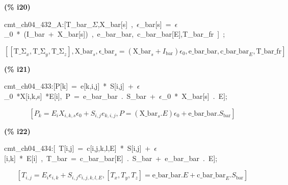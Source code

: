 \documentclass[fleqn]{article}
\begin{document}
\noindent
\begin{minipage}[t]{4.000000em}\color{red}\bfseries
(\% i20)	
\end{minipage}
\begin{minipage}[t]{\textwidth}\color{blue}
cmt\_ch04\_432\_A:[T\_bar\_\ensuremath{\Sigma},X\_bar[s]\ ,\ \ensuremath{\epsilon}\_bar[s]\ =\ \ensuremath{\epsilon}\_0\ *\ (I\_bar\ +\ X\_bar[s])\ ,\ e\_bar\_bar,\ c\_bar\_bar[E],T\_bar\_fr\ ]\ ;
\end{minipage}
\[\displaystyle \tag{\% o20} 
\left[ \left[ {{\ensuremath{\mathrm{T\_ \Sigma }}}_x}\operatorname{,}{{\ensuremath{\mathrm{T\_ \Sigma }}}_y}\operatorname{,}{{\ensuremath{\mathrm{T\_ \Sigma }}}_z}\right] \operatorname{,}{{\ensuremath{\mathrm{X\_ bar}}}_s}\operatorname{,}{{\ensuremath{\mathrm{\epsilon \_ bar}}}_s}=\left( {{\ensuremath{\mathrm{X\_ bar}}}_s}+{I_{\ensuremath{\mathrm{bar}}}}\right)  {{\epsilon }_0}\operatorname{,}\ensuremath{\mathrm{e\_ bar\_ bar}}\operatorname{,}{{\ensuremath{\mathrm{c\_ bar\_ bar}}}_E}\operatorname{,}\ensuremath{\mathrm{T\_ bar\_ fr}}\right] \mbox{}
\]


\noindent
\begin{minipage}[t]{4.000000em}\color{red}\bfseries
(\% i21)	
\end{minipage}
\begin{minipage}[t]{\textwidth}\color{blue}
cmt\_ch04\_433:[P[k]\ =\ e[k,i,j]\ *\ S[i,j]\ +\ \ensuremath{\epsilon}\_0\ *X[i,k,s]\ *E[i],\ P\ =\ e\_bar\_bar\ .\ S\_bar\ +\ \ensuremath{\epsilon}\_0\ *\ X\_bar[s]\ .\ E];
\end{minipage}
\[\displaystyle \tag{\% o21} 
\left[ {P_k}={E_i} {X_{i,k,s}} {{\epsilon }_0}+{S_{i,j}} {e_{k,i,j}}\operatorname{,}P=\left( {{\ensuremath{\mathrm{X\_ bar}}}_s}\ensuremath{\mathrm{ . }}E\right)  {{\epsilon }_0}+\ensuremath{\mathrm{e\_ bar\_ bar}}\ensuremath{\mathrm{ . }}{S_{\ensuremath{\mathrm{bar}}}}\right] \mbox{}
\]


\noindent
\begin{minipage}[t]{4.000000em}\color{red}\bfseries
(\% i22)	
\end{minipage}
\begin{minipage}[t]{\textwidth}\color{blue}
cmt\_ch04\_434:[\ T[i,j]\ =\ c[i,j,k,l,E]\ *\ S[i,j]\ +\ \ensuremath{\epsilon}[i,k]\ *\ E[i]\ ,\ T\_bar\ =\ c\_bar\_bar[E]\ .\ S\_bar\ +\ e\_bar\_bar\ .\ E];
\end{minipage}
\[\displaystyle \tag{\% o22} 
\left[ {T_{i,j}}={E_i} {{\epsilon }_{i,k}}+{S_{i,j}} {c_{i,j,k,l,E}}\operatorname{,}\left[ {T_x}\operatorname{,}{T_y}\operatorname{,}{T_z}\right] =\ensuremath{\mathrm{e\_ bar\_ bar}}\ensuremath{\mathrm{ . }}E+{{\ensuremath{\mathrm{c\_ bar\_ bar}}}_E}\ensuremath{\mathrm{ . }}{S_{\ensuremath{\mathrm{bar}}}}\right] \mbox{}
\]
\end{document}

